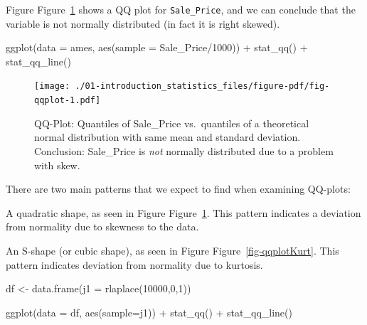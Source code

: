\documentclass[
  letterpaper,
  DIV=11,
  numbers=noendperiod]{scrreprt}
\newenvironment{Shaded}{\begin{snugshade}}{\end{snugshade}}
\newcommand{\AttributeTok}[1]{\textcolor[rgb]{0.40,0.45,0.13}{#1}}
\newcommand{\DecValTok}[1]{\textcolor[rgb]{0.68,0.00,0.00}{#1}}
\newcommand{\FunctionTok}[1]{\textcolor[rgb]{0.28,0.35,0.67}{#1}}
\newcommand{\NormalTok}[1]{\textcolor[rgb]{0.00,0.23,0.31}{#1}}
\newcommand{\OtherTok}[1]{\textcolor[rgb]{0.00,0.23,0.31}{#1}}
\newcommand{\SpecialCharTok}[1]{\textcolor[rgb]{0.37,0.37,0.37}{#1}}
\begin{document}
Figure Figure~\ref{fig-qqplot} shows a QQ plot for \texttt{Sale\_Price},
and we can conclude that the variable is not normally distributed (in
fact it is right skewed).

\begin{Shaded}
\begin{Highlighting}[]
\FunctionTok{ggplot}\NormalTok{(}\AttributeTok{data =}\NormalTok{ ames, }\FunctionTok{aes}\NormalTok{(}\AttributeTok{sample =}\NormalTok{ Sale\_Price}\SpecialCharTok{/}\DecValTok{1000}\NormalTok{)) }\SpecialCharTok{+}
  \FunctionTok{stat\_qq}\NormalTok{() }\SpecialCharTok{+}
  \FunctionTok{stat\_qq\_line}\NormalTok{()}
\end{Highlighting}
\end{Shaded}

\begin{figure}[H]

{\centering \texttt{[image: ./01-introduction\_statistics\_files/figure-pdf/fig-qqplot-1.pdf]}

}

\caption{\label{fig-qqplot}QQ-Plot: Quantiles of Sale\_Price
vs.~quantiles of a theoretical normal distribution with same mean and
standard deviation. Conclusion: Sale\_Price is \emph{not} normally
distributed due to a problem with skew.}

\end{figure}

There are two main patterns that we expect to find when examining
QQ-plots:

A quadratic shape, as seen in Figure Figure~\ref{fig-qqplot}. This
pattern indicates a deviation from normality due to skewness to the
data.

An S-shape (or cubic shape), as seen in Figure
Figure~\ref{fig-qqplotKurt}. This pattern indicates deviation from
normality due to kurtosis.

\begin{Shaded}
\begin{Highlighting}[]
\NormalTok{df }\OtherTok{\textless{}{-}} \FunctionTok{data.frame}\NormalTok{(}\AttributeTok{j1 =} \FunctionTok{rlaplace}\NormalTok{(}\DecValTok{10000}\NormalTok{,}\DecValTok{0}\NormalTok{,}\DecValTok{1}\NormalTok{))}

\FunctionTok{ggplot}\NormalTok{(}\AttributeTok{data =}\NormalTok{ df, }\FunctionTok{aes}\NormalTok{(}\AttributeTok{sample=}\NormalTok{j1)) }\SpecialCharTok{+}
  \FunctionTok{stat\_qq}\NormalTok{() }\SpecialCharTok{+}
  \FunctionTok{stat\_qq\_line}\NormalTok{()}
\end{Highlighting}
\end{Shaded}
\end{document}
